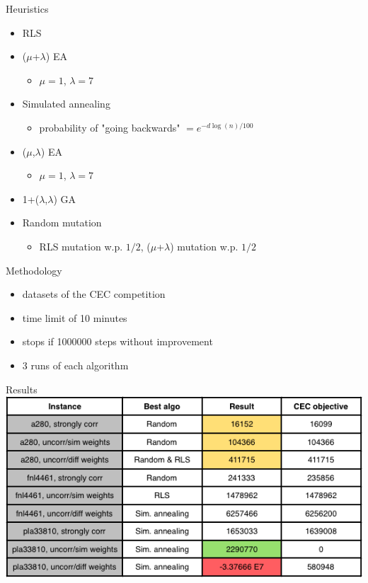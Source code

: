 \documentclass{beamer}
\begin{document}
\begin{frame}{Heuristics}
\begin{itemize}
\item RLS
\item ($\mu$+$\lambda$) EA
\begin{itemize}
\item $\mu=1$, $\lambda=7$
\end{itemize}
\item Simulated annealing
\begin{itemize}
\item probability of "going backwards" $=e^{-d\log(n)/100}$
\end{itemize}
\item ($\mu$,$\lambda$) EA
\begin{itemize}
\item $\mu=1$, $\lambda=7$
\end{itemize}
\item 1+($\lambda$,$\lambda$) GA
\item Random mutation
\begin{itemize}
\item RLS mutation w.p. $1/2$, ($\mu$+$\lambda$) mutation w.p. $1/2$
\end{itemize}
\end{itemize}


\end{frame}
\begin{frame}{Methodology}
\begin{itemize}
\item datasets of the CEC competition
\item time limit of 10 minutes
\item stops if 1000000 steps without improvement
\item 3 runs of each algorithm
\end{itemize}

\end{frame}

\begin{frame}{Results}
\includegraphics[scale=0.6]{tableau}
\end{frame}
\end{document}
